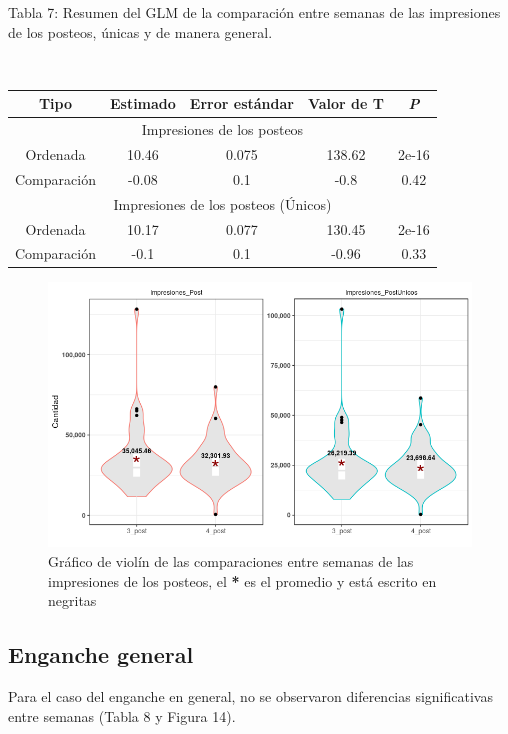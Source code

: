 \documentclass[a4paper,10pt]{article}
\begin{document}
\begin{center}
 \caption{Tabla 7: Resumen del GLM de la comparación entre semanas de las  impresiones de los posteos, únicas y de manera general.} \\[0.3cm]
 {\footnotesize
 \begin{tabular}{c|c|c|c|c}
  \hline
  Tipo & Estimado & Error estándar & Valor de T & \textit{P} \\
  \hline
  \multicolumn{5}{c}{Impresiones de los posteos} \\
  \hline
  Ordenada & 10.46 & 0.075 & 138.62 & 2e-16 \\
  Comparación & -0.08 & 0.1 & -0.8 & 0.42 \\
  \hline
  \multicolumn{5}{c}{Impresiones de los posteos (Únicos)} \\
  \hline
  Ordenada & 10.17 & 0.077 & 130.45 & 2e-16 \\
  Comparación & -0.1 & 0.1 & -0.96 & 0.33 \\
  \hline  
 \end{tabular}
 }
\end{center}

\begin{figure}[H]
 \begin{center}
  \includegraphics[width = .75\textwidth]{imagenes/graficas/comparacion6.png}
  \caption{Gráfico de violín de las comparaciones entre semanas de las impresiones de los posteos, el 
  \textbf{*} es el promedio y está escrito en negritas}
 \end{center}
\end{figure}

\subsection{Enganche general}
Para el caso del enganche en general, no se observaron diferencias significativas
entre semanas (Tabla 8 y Figura 14).
\end{document}
